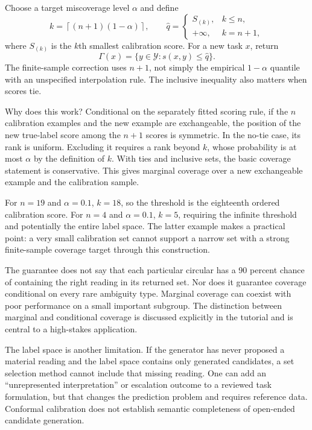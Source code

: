 \documentclass[12pt,a4paper,oneside,openany]{book}
\begin{document}
Choose a target miscoverage level $\alpha$ and define
\begin{equation}
 k=\left\lceil(n+1)(1-\alpha)\right\rceil,
 \qquad
 \widehat q=\begin{cases}
 S_{(k)},&k\leq n,\\
 +\infty,&k=n+1,
 \end{cases}
 \label{eq:conformal-quantile}
\end{equation}
where $S_{(k)}$ is the $k$th smallest calibration score. For a new task $x$, return
\begin{equation}
 \Gamma(x)=\{y\in\mathcal Y:s(x,y)\leq\widehat q\}.
 \label{eq:conformal-set}
\end{equation}
The finite-sample correction uses $n+1$, not simply the empirical $1-\alpha$
quantile with an unspecified interpolation rule. The inclusive inequality also
matters when scores tie.

Why does this work? Conditional on the separately fitted scoring rule, if the
$n$ calibration examples and the new example are exchangeable, the position of
the new true-label score among the $n+1$ scores is symmetric. In the no-tie case,
its rank is uniform. Excluding it requires a rank beyond $k$, whose probability
is at most $\alpha$ by the definition of $k$. With ties and inclusive sets, the
basic coverage statement is conservative. This gives marginal coverage over a
new exchangeable example and the calibration sample.

For $n=19$ and $\alpha=0.1$, $k=18$, so the threshold is the eighteenth ordered
calibration score. For $n=4$ and $\alpha=0.1$, $k=5$, requiring the infinite
threshold and potentially the entire label space. The latter example makes a
practical point: a very small calibration set cannot support a narrow set with a
strong finite-sample coverage target through this construction.

The guarantee does not say that each particular circular has a 90 percent chance
of containing the right reading in its returned set. Nor does it guarantee
coverage conditional on every rare ambiguity type. Marginal coverage can coexist
with poor performance on a small important subgroup. The distinction between
marginal and conditional coverage is discussed explicitly in the tutorial
\citep[section 3]{conformal2022} and is central to a high-stakes application.

The label space is another limitation. If the generator has never proposed a
material reading and the label space contains only generated candidates, a set
selection method cannot include that missing reading. One can add an
``unrepresented interpretation'' or escalation outcome to a reviewed task
formulation, but that changes the prediction problem and requires reference data.
Conformal calibration does not establish semantic completeness of open-ended
candidate generation.
\end{document}
